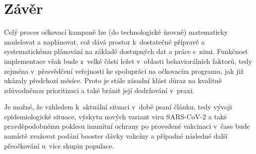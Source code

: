 \section*{Závěr}

Celý proces očkovací kampaně lze (do technologické úrovně) matematicky modelovat a naplánovat, což dává prostor k~dostatečné přípravě a systematickému plánování na základě dostupných dat a práce s~nimi. Funkčnost implementace však bude z~velké části ležet v~oblasti behaviorálních faktorů, tedy zejména v~přesvědčení veřejnosti ke spolupráci na očkovacím programu, jak již ukázaly předchozí měsíce. 
%
Proto je stále zásadní klást důraz na kvalitně zdůvodněnou prioritizaci a také bránit její dodržování v~praxi. %

Je možné, že vzhledem k~aktuální situaci v~době psaní článku, tedy vývoji epidemiologické situace, výskytu nových variant viru SARS-CoV-2 a také prav\-dě\-po\-dob\-né\-mu poklesu imunitní ochrany po provedené vakcinaci v~čase bude namístě zvažovat podání booster dávky vakcíny a případné následné další přeočkování u~více skupin populace. %

